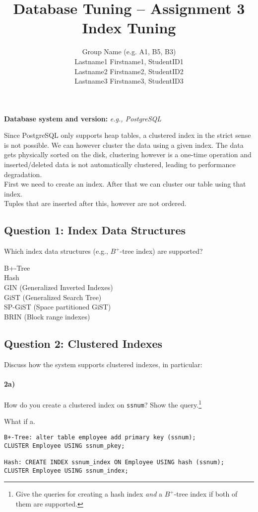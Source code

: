 \documentclass[11pt]{scrartcl}
\title{
  \textbf{\large Database Tuning -- Assignment 3}\\
  Index Tuning
}
\author{
 Group Name (e.g. A1, B5, B3)\\
 \large Lastname1 Firstname1, StudentID1 \\
 \large Lastname2 Firstname2, StudentID2 \\
 \large Lastname3 Firstname3, StudentID3 
}
\begin{document}
\maketitle

\medskip

\noindent\textbf{Database system and version:} {\it e.g., PostgreSQL}

\vspace{1em}
Since PostgreSQL only supports heap tables, a clustered index in the strict sense
is not possible. We can however cluster the data using a given index. The data
gets physically sorted on the disk, clustering however is a one-time operation
and inserted/deleted data is not automatically clustered, leading to performance
degradation.\\
First we need to create an index. After that we can cluster our table using that index.\\
Tuples that are inserted after this, however are not ordered.

\subsection*{Question 1: Index Data Structures} Which index data structures (e.g., $B^+$-tree
index) are supported?

\vspace{1em}
B+-Tree\\
Hash\\
GIN (Generalized Inverted Indexes)\\
GiST (Generalized Search Tree)\\
SP-GiST (Space partitioned GiST)\\
BRIN (Block range indexes)

\subsection*{Question 2: Clustered Indexes} Discuss how the system
supports clustered indexes, in particular:

\paragraph{2a)} How do you create a clustered index on {\tt ssnum}?
Show the query.\footnote{Give the queries for creating a hash index
  \emph{and} a $B^+$-tree index if both of them are supported.}

What if a.

{\small
\begin{verbatim}
B+-Tree: alter table employee add primary key (ssnum);
CLUSTER Employee USING ssnum_pkey;

Hash: CREATE INDEX ssnum_index ON Employee USING hash (ssnum);
CLUSTER Employee USING ssnum_index;
\end{verbatim}
}
\end{document}
